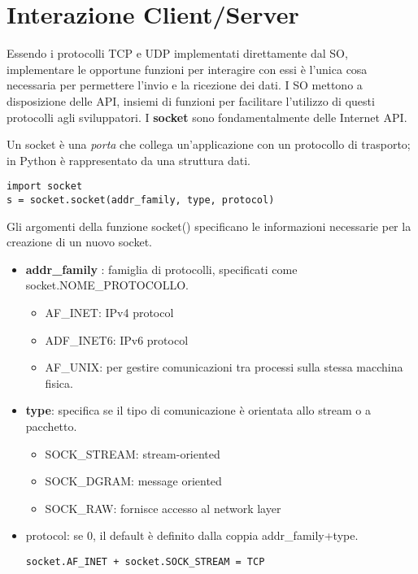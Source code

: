 \section{Interazione Client/Server}
Essendo i protocolli TCP e UDP implementati direttamente dal SO, implementare le opportune funzioni per interagire con essi è l'unica cosa necessaria per permettere l'invio e la ricezione dei dati.
I SO mettono a disposizione delle API, insiemi di funzioni per facilitare l'utilizzo di questi protocolli agli sviluppatori.
I \textbf{socket} sono fondamentalmente delle Internet API.

Un socket è una \textit{porta} che collega un'applicazione con un protocollo di trasporto; in Python è rappresentato da una struttura dati.

\begin{lstlisting}
import socket
s = socket.socket(addr_family, type, protocol)
\end{lstlisting}

Gli argomenti della funzione socket() specificano le informazioni necessarie per la creazione di un nuovo socket.

\begin{itemize}
\item \textbf{addr\_family} : famiglia di protocolli, specificati come socket.NOME\_PROTOCOLLO.
\begin{itemize}
	 \item AF\_INET: IPv4 protocol
	 \item ADF\_INET6: IPv6 protocol
	 \item AF\_UNIX: per gestire comunicazioni tra processi sulla stessa macchina fisica.
\end{itemize}
\item \textbf{type}: specifica se il tipo di comunicazione è orientata allo stream o a pacchetto.
\begin{itemize}
	\item SOCK\_STREAM: stream-oriented
	\item SOCK\_DGRAM: message oriented
	\item SOCK\_RAW: fornisce accesso al network layer
\end{itemize}
\item protocol: se 0, il default è definito dalla coppia addr\_family+type.
\begin{lstlisting}
socket.AF_INET + socket.SOCK_STREAM = TCP
\end{lstlisting}
\end{itemize}

